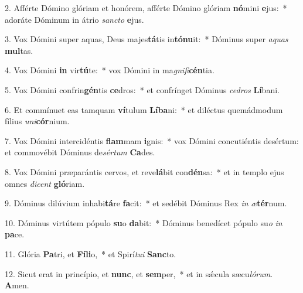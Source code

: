 2. Afférte Dómino glóriam et honórem, afférte Dómino glóriam \textbf{nó}mini \textbf{e}jus:~*  adoráte Dóminum in átrio \textit{sanc}\textit{to} \textbf{e}jus.\

3. Vox Dómini super aquas, Deus majes\textbf{tá}tis in\textbf{tó}\textbf{nu}it:~*  Dóminus super \textit{a}\textit{quas} \textbf{mul}tas.\

4. Vox Dómini \textbf{in} vir\textbf{tú}te:~*  vox Dómini in ma\textit{gni}\textit{fi}\textbf{cén}tia.\

5. Vox Dómini confrin\textbf{gén}tis \textbf{ce}dros:~*  et confrínget Dóminus \textit{ce}\textit{dros} \textbf{Lí}bani.\

6. Et commínuet eas tamquam \textbf{ví}tulum \textbf{Lí}\textbf{ba}ni:~*  et diléctus quemádmodum fílius \textit{u}\textit{ni}\textbf{cór}nium.\

7. Vox Dómini intercidéntis \textbf{flam}mam \textbf{i}gnis:~*  vox Dómini concutiéntis desértum: et commovébit Dóminus de\textit{sér}\textit{tum} \textbf{Ca}des.\

8. Vox Dómini præparántis cervos, et reve\textbf{lá}bit con\textbf{dén}sa:~*  et in templo ejus omnes \textit{di}\textit{cent} \textbf{gló}riam.\

9. Dóminus dilúvium inhabi\textbf{tá}re \textbf{fa}cit:~*  et sedébit Dóminus Rex \textit{in} \textit{æ}\textbf{tér}num.\

10. Dóminus virtútem pópulo \textbf{su}o \textbf{da}bit:~*  Dóminus benedícet pópulo su\textit{o} \textit{in} \textbf{pa}ce.\

11. Glória \textbf{Pa}tri, et \textbf{Fí}\textbf{li}o,~*  et Spirí\textit{tu}\textit{i} \textbf{Sanc}to.\

12. Sicut erat in princípio, et \textbf{nunc}, et \textbf{sem}per,~*  et in sǽcula sæcu\textit{ló}\textit{rum}. \textbf{A}men.\

